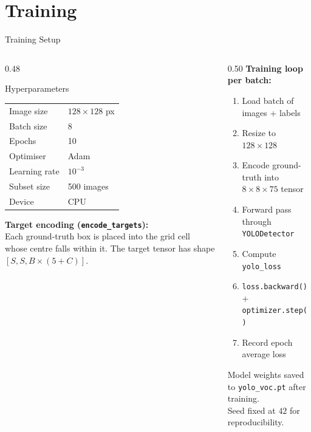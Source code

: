 \documentclass[aspectratio=169, 10pt]{beamer}
\begin{document}
\section{Training}

\begin{frame}{Training Setup}
\begin{columns}[T]
\begin{column}{0.48\textwidth}
  \begin{block}{Hyperparameters}
    \begin{tabular}{ll}
      Image size    & $128 \times 128$ px \\[3pt]
      Batch size    & 8                   \\[3pt]
      Epochs        & 10                  \\[3pt]
      Optimiser     & Adam                \\[3pt]
      Learning rate & $10^{-3}$           \\[3pt]
      Subset size   & 500 images          \\[3pt]
      Device        & CPU                 \\
    \end{tabular}
  \end{block}

  \vspace{0.1cm}
  \textbf{Target encoding (\texttt{encode\_targets}):}\\
  Each ground-truth box is placed into the grid cell
  whose centre falls within it. The target tensor has
  shape $[S, S, B{\times}(5{+}C)]$.
\end{column}
\begin{column}{0.50\textwidth}
  \textbf{Training loop per batch:}
  \begin{enumerate}
    \item Load batch of images + labels
    \item Resize to $128\times128$
    \item Encode ground-truth into $8\times8\times75$ tensor
    \item Forward pass through \texttt{YOLODetector}
    \item Compute \texttt{yolo\_loss}
    \item \texttt{loss.backward()} + \texttt{optimizer.step()}
    \item Record epoch average loss
  \end{enumerate}

  \vspace{0.1cm}
  Model weights saved to \texttt{yolo\_voc.pt} after training.\\[4pt]
  Seed fixed at $42$ for reproducibility.
\end{column}
\end{columns}
\end{frame}
\end{document}
